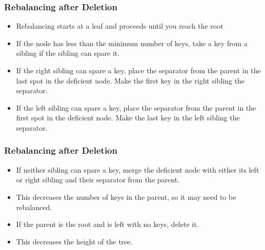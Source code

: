 \documentclass{beamer}
\begin{document}
\begin{frame}
\frametitle{Rebalancing after Deletion}

\begin{itemize}
\item Rebalancing starts at a leaf and proceeds until you reach the root
\item If the node has less than the minimum number of keys, take a key from a sibling if the sibling can spare it.
\item If the right sibling can spare a key, place the separator from the parent in the last spot in the deficient node. Make the first key in the right sibling the separator.
\item If the left sibling can spare a key, place the separator from the parent in the first spot in the deficient node. Make the last key in the left sibling the separator.

\end{itemize}
\end{frame}



\begin{frame}
\frametitle{Rebalancing after Deletion}

\begin{itemize}
\item If neither sibling can spare a key, merge the deficient node with either its left or right sibling and their separator from the parent. 
\item This decreases the number of keys in the parent, so it may need to be rebalanced.
\item If the parent is the root and is left with no keys, delete it.
\item This decreases the height of the tree.
\end{itemize}
\end{frame}
\end{document}
